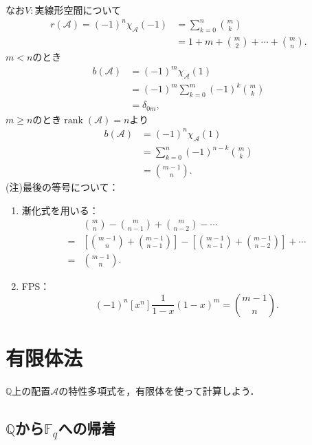 \documentclass[xelatex,ja=standard,a4paper,14pt,everyparhook=compat]{bxjsarticle}
\newcommand{\bbQ}{\mathbb{Q}}
\newcommand{\bbF}{\mathbb{F}}
\newcommand{\mcA}{\mathcal{A}}
\DeclareMathOperator{\rank}{rank}
\theoremstyle{definition}
\begin{document}
なお$V:\text{実線形空間}$について \begin{align*}
    r(\mcA) = (-1)^n \chi_\mcA(-1)
     & = \sum_{k=0}^n \binom{m}{k}                     \\
     & = 1 + m + \binom{m}{2} + \cdots + \binom{m}{n}.
\end{align*}
$m < n$のとき \begin{align*}
    b(\mcA) & = (-1)^m \chi_\mcA(1)                     \\
            & = (-1)^m \sum_{k=0}^m (-1)^k \binom{m}{k} \\
            & = \delta_{0m},
\end{align*}
$m \geq n$のとき$\rank(\mcA) = n$より \begin{align*}
    b(\mcA) & = (-1)^n \chi_\mcA(1)                  \\
            & = \sum_{k=0}^n (-1)^{n-k} \binom{m}{k} \\
            & = \binom{m-1}{n}.
\end{align*}
(注)最後の等号について： \begin{enumerate}
    \item 漸化式を用いる： \begin{align*}
                  & \binom{m}{n} - \binom{m}{n-1} + \binom{m}{n-2} - \cdots                                                \\
              ={} & \left[\binom{m-1}{n}+\binom{m-1}{n-1}\right] - \left[\binom{m-1}{n-1}+\binom{m-1}{n-2}\right] + \cdots \\
              ={} & \binom{m-1}{n}.
          \end{align*}
    \item FPS： \begin{equation*}
              (-1)^n [x^n] \frac{1}{1-x}(1-x)^m = \binom{m-1}{n}.
          \end{equation*}
\end{enumerate}

\newpage

\section{有限体法}

$\bbQ$上の配置$\mcA$の特性多項式を，有限体を使って計算しよう．

\subsection{$\bbQ$から$\bbF_q$への帰着}
\end{document}
